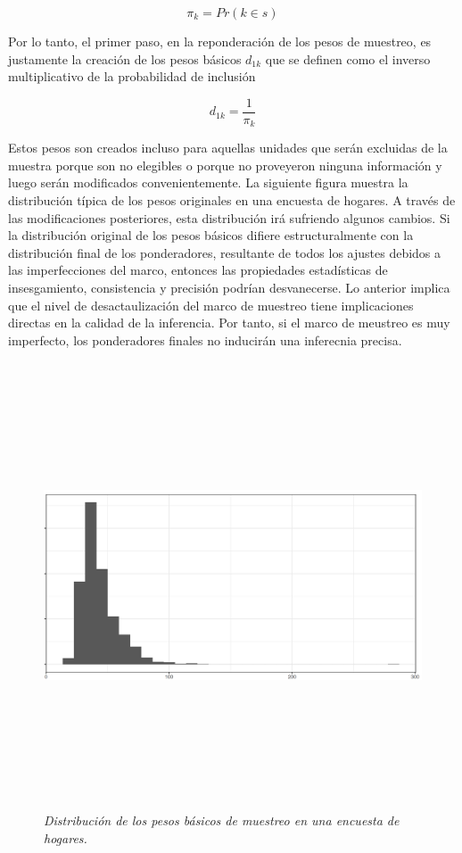 \documentclass[
  10pt,
  spanish,
]{book}
\begin{document}
\[\pi_k = Pr (k \in s)\]

Por lo tanto, el primer paso, en la reponderación de los pesos de muestreo, es justamente la creación de los pesos básicos \(d_{1k}\) que se definen como el inverso multiplicativo de la probabilidad de inclusión

\[d_{1k} = \frac{1}{\pi_k}\]

Estos pesos son creados incluso para aquellas unidades que serán excluidas de la muestra porque son no elegibles o porque no proveyeron ninguna información y luego serán modificados convenientemente. La siguiente figura muestra la distribución típica de los pesos originales en una encuesta de hogares. A través de las modificaciones posteriores, esta distribución irá sufriendo algunos cambios. Si la distribución original de los pesos básicos difiere estructuralmente con la distribución final de los ponderadores, resultante de todos los ajustes debidos a las imperfecciones del marco, entonces las propiedades estadísticas de insesgamiento, consistencia y precisión podrían desvanecerse. Lo anterior implica que el nivel de desactaulización del marco de muestreo tiene implicaciones directas en la calidad de la inferencia. Por tanto, si el marco de meustreo es muy imperfecto, los ponderadores finales no inducirán una inferecnia precisa.

\begin{figure}
\centering
\includegraphics[width=\textwidth,height=5.20833in]{Pics/15.png}
\caption{\emph{Distribución de los pesos básicos de muestreo en una encuesta de hogares.}}
\end{figure}
\end{document}
